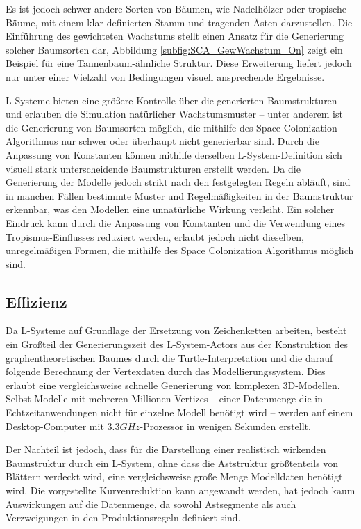 Es ist jedoch schwer andere Sorten von Bäumen, wie Nadelhölzer oder tropische Bäume, mit einem klar definierten Stamm und tragenden Ästen darzustellen. Die Einführung des gewichteten Wachstums stellt einen Ansatz für die Generierung solcher Baumsorten dar, Abbildung \ref{subfig:SCA_GewWachstum_On} zeigt ein Beispiel für eine Tannenbaum-ähnliche Struktur. Diese Erweiterung liefert jedoch nur unter einer Vielzahl von Bedingungen visuell ansprechende Ergebnisse.

L-Systeme bieten eine größere Kontrolle über die generierten Baumstrukturen und erlauben die Simulation natürlicher Wachstumsmuster -- unter anderem ist die Generierung von Baumsorten möglich, die mithilfe des Space Colonization Algorithmus nur schwer oder überhaupt nicht generierbar sind. Durch die Anpassung von Konstanten können mithilfe derselben L-System-Definition sich visuell stark unterscheidende Baumstrukturen erstellt werden. Da die Generierung der Modelle jedoch strikt nach den festgelegten Regeln abläuft, sind in manchen Fällen bestimmte Muster und Regelmäßigkeiten in der Baumstruktur erkennbar, was den Modellen eine unnatürliche Wirkung verleiht. Ein solcher Eindruck kann durch die Anpassung von Konstanten und die Verwendung eines Tropismus-Einflusses reduziert werden, erlaubt jedoch nicht dieselben, unregelmäßigen Formen, die mithilfe des Space Colonization Algorithmus möglich sind. \cite[S.6]{SpaceColonizationAlgorithm:07}

\subsection{Effizienz}

Da L-Systeme auf Grundlage der Ersetzung von Zeichenketten arbeiten, besteht ein Großteil der Generierungszeit des L-System-Actors aus der Konstruktion des graphentheoretischen Baumes durch die Turtle-Interpretation und die darauf folgende Berechnung der Vertexdaten durch das Modellierungssystem. Dies erlaubt eine vergleichsweise schnelle Generierung von komplexen 3D-Modellen. Selbst Modelle mit mehreren Millionen Vertizes -- einer Datenmenge die in Echtzeitanwendungen nicht für einzelne Modell benötigt wird -- werden auf einem Desktop-Computer mit $3.3GHz$-Prozessor in wenigen Sekunden erstellt.

Der Nachteil ist jedoch, dass für die Darstellung einer realistisch wirkenden Baumstruktur durch ein L-System, ohne dass die Aststruktur größtenteils von Blättern verdeckt wird, eine vergleichsweise große Menge Modelldaten benötigt wird. Die vorgestellte Kurvenreduktion kann angewandt werden, hat jedoch kaum Auswirkungen auf die Datenmenge, da sowohl Astsegmente als auch Verzweigungen in den Produktionsregeln definiert sind.

